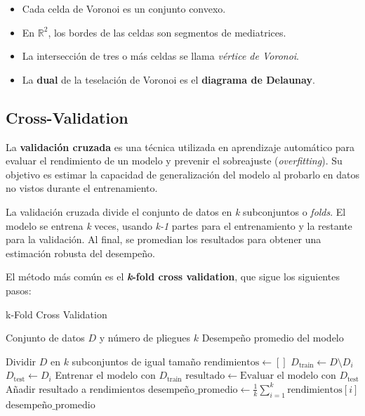 \documentclass[titlepage,a4paper]{article}
\begin{document}
\begin{itemize}
    \item Cada celda de Voronoi es un conjunto convexo.
    \item En $\mathbb{R}^2$, los bordes de las celdas son segmentos de mediatrices.
    \item La intersección de tres o más celdas se llama \textit{vértice de Voronoi}.
    \item La \textbf{dual} de la teselación de Voronoi es el \textbf{diagrama de Delaunay}.
\end{itemize}

\subsection{Cross-Validation}
La \textbf{validación cruzada} es una técnica utilizada en aprendizaje automático para evaluar el rendimiento de un modelo y prevenir el sobreajuste (\textit{overfitting}). Su objetivo es estimar la capacidad de generalización del modelo al probarlo en datos no vistos durante el entrenamiento.


La validación cruzada divide el conjunto de datos en \textit{k} subconjuntos o \textit{folds}. El modelo se entrena \textit{k} veces, usando \textit{k-1} partes para el entrenamiento y la restante para la validación. Al final, se promedian los resultados para obtener una estimación robusta del desempeño.


El método más común es el \textbf{\textit{k}-fold cross validation}, que sigue los siguientes pasos:

\begin{algorithm}
\caption{k-Fold Cross Validation}
\begin{algorithmic}[1]
\Require Conjunto de datos \( D \) y número de pliegues \( k \)
\Ensure Desempeño promedio del modelo

\State Dividir \( D \) en \( k \) subconjuntos de igual tamaño
\State \( \text{rendimientos} \gets [] \)
    \State \( D_{\text{train}} \gets D \setminus D_i \) 
    \State \( D_{\text{test}} \gets D_i \) 
    \State Entrenar el modelo con \( D_{\text{train}} \)
    \State \( \text{resultado} \gets \text{Evaluar el modelo con } D_{\text{test}} \)
    \State Añadir \( \text{resultado} \) a \( \text{rendimientos} \)
\EndFor
\State \( \text{desempeño\_promedio} \gets \frac{1}{k} \sum_{i=1}^{k} \text{rendimientos}[i] \)
\State \Return \( \text{desempeño\_promedio} \)
\end{algorithmic}
\end{algorithm}
\end{document}
